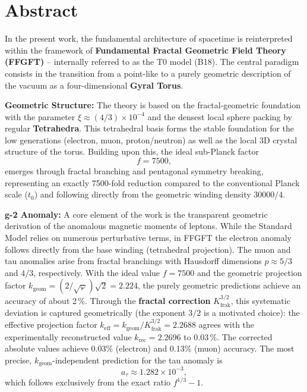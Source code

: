 \section*{Abstract}
		In the present work, the fundamental architecture of spacetime is reinterpreted within the framework of \textbf{Fundamental Fractal Geometric Field Theory (FFGFT)} – internally referred to as the T0 model (B18). The central paradigm consists in the transition from a point-like to a purely geometric description of the vacuum as a four-dimensional \textbf{Gyral Torus}.
		
		\textbf{Geometric Structure:} The theory is based on the fractal-geometric foundation with the parameter $\xi \approx (4/3)\times 10^{-4}$ and the densest local sphere packing by regular \textbf{Tetrahedra}. This tetrahedral basis forms the stable foundation for the low generations (electron, muon, proton/neutron) as well as the local 3D crystal structure of the torus. Building upon this, the ideal sub-Planck factor
		\begin{equation*}
			f = 7500,
		\end{equation*}
		emerges through fractal branching and pentagonal symmetry breaking, representing an exactly 7500-fold reduction compared to the conventional Planck scale ($t_0$) and following directly from the geometric winding density $30000/4$.
		
		\textbf{g-2 Anomaly:} A core element of the work is the transparent geometric derivation of the anomalous magnetic moments of leptons. While the Standard Model relies on numerous perturbative terms, in FFGFT the electron anomaly follows directly from the base winding (tetrahedral projection). The muon and tau anomalies arise from fractal branchings with Hausdorff dimensions $p \approx 5/3$ and $4/3$, respectively. With the ideal value $f = 7500$ and the geometric projection factor $k_\text{geom} = (2/\sqrt{\varphi})\sqrt{2} = 2.224$, the purely geometric predictions achieve an accuracy of about 2\,\%. Through the \textbf{fractal correction} $K_\text{frak}^{3/2}$, this systematic deviation is captured geometrically (the exponent $3/2$ is a motivated choice): the effective projection factor $k_\text{eff} = k_\text{geom}/K_\text{frak}^{3/2} = 2.2688$ agrees with the experimentally reconstructed value $k_\text{rec} = 2.2696$ to 0.03\,\%. The corrected absolute values achieve 0.03\% (electron) and 0.13\% (muon) accuracy. The most precise, $k_\text{geom}$-independent prediction for the tau anomaly is
		\begin{equation*}
			a_\tau \approx 1.282 \times 10^{-3},
		\end{equation*}
		which follows exclusively from the exact ratio $f^{1/3} - 1$.
		
